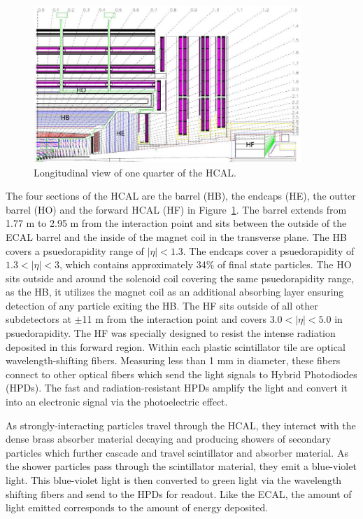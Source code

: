 \begin{figure}[hbtp]
 \begin{center}
   \includegraphics[width=0.9\textwidth]{hcal.pdf}
   \caption[text in square brackets]{Longitudinal view of one quarter of the HCAL.}
   \label{fig:cms_hcal}
 \end{center}
\end{figure}

The four sections of the HCAL are the barrel (HB), the endcaps (HE), the outter barrel (HO) and the forward HCAL (HF) in Figure~\ref{fig:cms_hcal}. The barrel extends from 1.77 m to 2.95 m from the interaction point and
sits between the outside of the ECAL barrel and the inside of the magnet coil in the transverse plane. The HB covers a psuedorapidity range of $|\eta| < 1.3$.
The endcaps cover a psuedorapidity of $1.3 < |\eta| < 3$, which contains approximately 34$\%$ of final state particles. The HO sits outside and around the solenoid coil covering the same psuedorapidity range,
as the HB, it utilizes the magnet coil as an additional absorbing layer ensuring detection of any particle exiting the HB. The HF sits outside of all other subdetectors at $\pm$11 m from the interaction point
and covers $3.0 < |\eta| < 5.0$ in psuedorapidity. The HF was specially designed to resist the intense radiation deposited in this forward region. Within each plastic scintillator tile are optical wavelength-shifting fibers.
Measuring less than 1 mm in diameter, these fibers connect to other optical fibers which send the light signals to Hybrid Photodiodes (HPDs). The fast and radiation-resistant HPDs amplify the light and convert it
into an electronic signal via the photoelectric effect.

As strongly-interacting particles travel through the HCAL, they interact with the dense brass absorber material decaying and producing showers of secondary particles which further cascade and travel scintillator and absorber material.
As the shower particles pass through the scintillator material, they emit a blue-violet light. This blue-violet light is then converted to green light via the wavelength shifting fibers and send to the HPDs for readout. Like the ECAL,
the amount of light emitted corresponds to the amount of energy deposited. 

